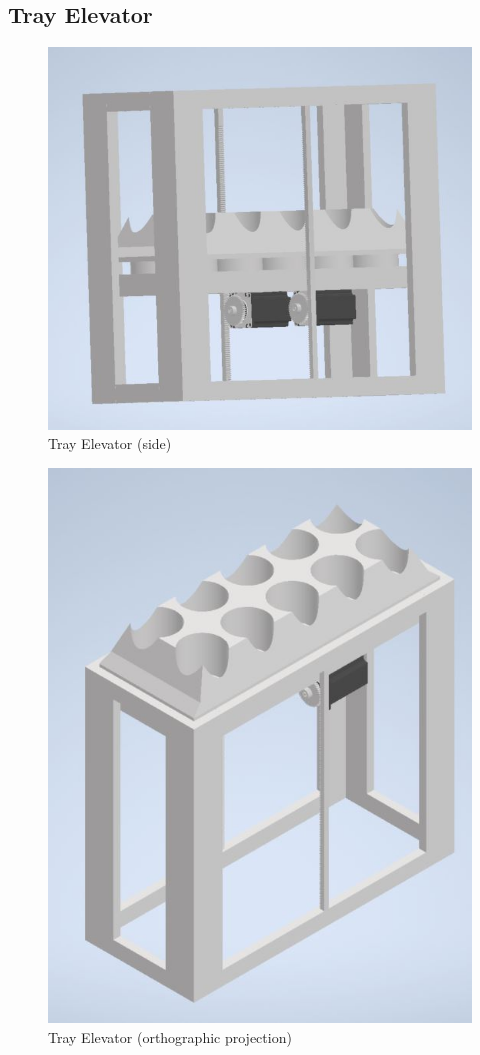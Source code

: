 \documentclass[12pt, titlepage]{article}
\begin{document}
\subsection{Tray Elevator}
\begin{figure}[H]
  \centering
  \includegraphics{Tray_Elevator.jpg}
  \caption{Tray Elevator (side)}
  \label{fig:elevator1}
\end{figure}

\begin{figure}[H]
  \centering
  \includegraphics{Tray_Elevator2.jpg}
  \caption{Tray Elevator (orthographic projection)}
  \label{fig:elevator2}
\end{figure}
\end{document}
